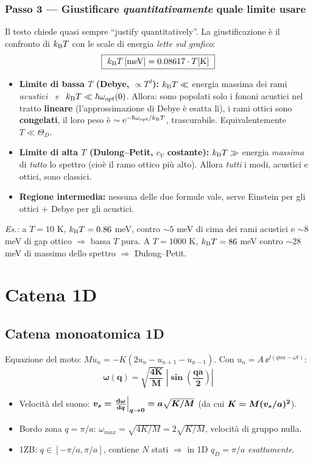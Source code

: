 \subsubsection*{Passo 3 --- Giustificare \emph{quantitativamente} quale limite usare}
Il testo chiede quasi sempre ``justify quantitatively''. La giustificazione è il confronto di $k_{\mathrm{B}} T$ con le scale di energia \emph{lette sul grafico}:
\[ \boxed{\ k_{\mathrm{B}} T\,[\text{meV}] = 0.08617\cdot T[\text{K}]\ } \]
\begin{itemize}
  \item \textbf{Limite di bassa $T$ (Debye, $\propto T^{d}$):} $k_{\mathrm{B}} T \ll$ energia massima dei rami \emph{acustici} \ \emph{e} \ $k_{\mathrm{B}} T\ll \hbar\omega_{opt}(0)$. Allora: sono popolati solo i fononi acustici nel tratto \textbf{lineare} (l'approssimazione di Debye è esatta lì),  i rami ottici sono \textbf{congelati}, il loro peso è $\sim\mathrm{e}^{-\hbar\omega_{opt}/k_{\mathrm{B}} T}$, trascurabile. Equivalentemente $T\ll\Theta_D$.
  \item \textbf{Limite di alta $T$ (Dulong--Petit, $c_V$ costante):} $k_{\mathrm{B}} T\gg$ energia \emph{massima} di \emph{tutto} lo spettro (cioè il ramo ottico più alto). Allora \emph{tutti} i modi, acustici e ottici, sono classici.
  \item \textbf{Regione intermedia:} nessuna delle due formule vale, serve Einstein per gli ottici $+$ Debye per gli acustici.
\end{itemize}
\textit{Es.:} a $T=10$ K, $k_{\mathrm{B}} T=0.86$ meV, contro $\sim5$ meV di cima dei rami acustici e $\sim8$ meV di gap ottico $\Rightarrow$ bassa $T$ pura. A $T=1000$ K, $k_{\mathrm{B}} T=86$ meV contro $\sim28$ meV di massimo dello spettro $\Rightarrow$ Dulong--Petit.

\newpage
\section{Catena 1D}

\subsection{Catena monoatomica 1D}
Equazione del moto: $M\ddot u_n = -K(2u_n - u_{n+1} - u_{n-1})$. Con $u_n = A\,\ee^{\ii(qna-\omega t)}$:
\[ \bm{\omega(q) = \sqrt{\frac{4K}{M}}\;\left|\sin\!\left(\frac{qa}{2}\right)\right|} \]
\begin{itemize}
  \item Velocità del suono: $\bm{v_s = \left.\frac{\mathrm{d}\omega}{\mathrm{d} q}\right|_{q\to0} = a\sqrt{K/M}}$ \quad(da cui $\bm{K = M(v_s/a)^2}$).
  \item Bordo zona $q=\pi/a$: $\omega_{max}=\sqrt{4K/M}=2\sqrt{K/M}$, velocità di gruppo nulla.
  \item 1ZB: $q\in[-\pi/a,\pi/a]$, contiene $N$ stati $\Rightarrow$ in 1D $q_D = \pi/a$ \emph{esattamente}.
\end{itemize}

